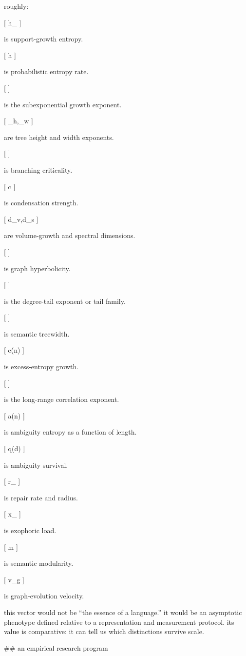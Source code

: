 roughly:

[
h_{}
]

is support-growth entropy.

[
h
]

is probabilistic entropy rate.

[
\alpha
]

is the subexponential growth exponent.

[
\beta_h,\beta_w
]

are tree height and width exponents.

[
\rho
]

is branching criticality.

[
c
]

is condensation strength.

[
d_v,d_s
]

are volume-growth and spectral dimensions.

[
\delta
]

is graph hyperbolicity.

[
\tau
]

is the degree-tail exponent or tail family.

[
]

is semantic treewidth.

[
e(n)
]

is excess-entropy growth.

[
\eta
]

is the long-range correlation exponent.

[
a(n)
]

is ambiguity entropy as a function of length.

[
q(d)
]

is ambiguity survival.

[
r_{}
]

is repair rate and radius.

[
x_{}
]

is exophoric load.

[
m
]

is semantic modularity.

[
v_g
]

is graph-evolution velocity.

this vector would not be “the essence of a language.” it would be an asymptotic phenotype defined relative to a representation and measurement protocol. its value is comparative: it can tell us which distinctions survive scale.

## an empirical research program

